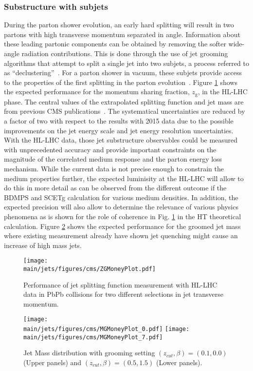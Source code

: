 \subsubsection{Substructure with subjets}
During the parton shower evolution, an early hard splitting will result in two partons with high transverse momentum separated in angle. Information about these leading partonic components can be obtained by removing the softer wide-angle radiation contributions. This is done through the use of jet grooming algorithms that attempt to split a single jet into two subjets, a process referred to as ``declustering''~\cite{Ellis:2009me,Butterworth:2008iy,Krohn:2009th,Dasgupta:2013ihk,Larkoski:2014wba}. For a parton shower in vacuum, these subjets provide access to the properties of the first splitting in the parton evolution~\cite{Altarelli:1977zs,Larkoski:2015lea}. Figure \ref{fig:ZG} shows the expected performance for the momentum sharing fraction, $z_{\mathrm{g}}$, in the HL-LHC phase. The central values of the extrapolated splitting function and jet mass are from previous CMS publications~\cite{Sirunyan:2017bsd,Sirunyan:2018gct}. The systematical uncertainties are reduced by a factor of two with respect to the results with 2015 data due to the possible improvements on the jet energy scale and jet energy resolution uncertainties. With the HL-LHC data, those jet substructure observables could be measured with unprecedented accuracy and provide important constraints on the magnitude of the correlated medium response and the parton energy loss mechanism. While the current data is not precise enough to constrain the medium properties further, the expected luminisity at the HL-LHC will allow to do this in more detail as can be observed from the different outcome if the BDMPS and SCETg calculation for various medium densities. In addition, the expected precision will also allow to determine the relevance of various physics phenomena as is shown for the role of coherence in Fig. \ref{fig:ZG} in the HT theoretical calculation. Figure \ref{fig:Mass} shows the expected performance for the groomed jet mass where existing measurement already have shown jet quenching might cause an increase of high mass jets.
\begin{figure}[!ht]
\begin{center}
\texttt{[image: \\main/jets/figures/cms/ZGMoneyPlot.pdf]}
\caption{Performance of jet splitting function measurement with HL-LHC data in PbPb collisions for two different selections in jet transverse momentum. \cite{CMS-FTR-17-002:2017dec}}
\label{fig:ZG}
\end{center}
\end{figure}
%
\begin{figure}[!ht]
\begin{center}
\texttt{[image: \\main/jets/figures/cms/MGMoneyPlot\_0.pdf]}
\texttt{[image: \\main/jets/figures/cms/MGMoneyPlot\_7.pdf]}
\caption{Jet Mass distribution with grooming setting $(z_{cut},\beta)=(0.1,0.0)$ (Upper panels) and $(z_{cut},\beta)=(0.5,1.5)$ (Lower panels). \cite{CMS-FTR-17-002:2017dec}}
\label{fig:Mass}
\end{center}
\end{figure}


